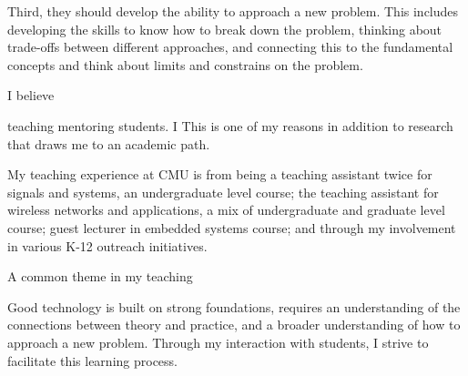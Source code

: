 \documentclass[10pt]{article}
\begin{document}
Third, they should develop the ability to approach a new problem. This includes developing the skills to know how to break down the problem, thinking about trade-offs between different approaches, and connecting this to the fundamental concepts and think about limits and constrains on the problem.





I believe 

 teaching
mentoring students. I This is one of my reasons in addition to research that draws me to an academic path. 

My teaching experience at CMU is from being a teaching assistant twice for signals and systems, an undergraduate level course; the teaching assistant for wireless networks and applications, a mix of undergraduate and graduate level course; guest lecturer in embedded systems course; and through my involvement in various K-12 outreach initiatives.

A common theme in my teaching 


Good technology is built on strong foundations, requires an understanding of the connections between theory and practice, and a broader understanding of how to approach a new problem.  Through my interaction with students, I strive to facilitate this learning process.
\end{document}
